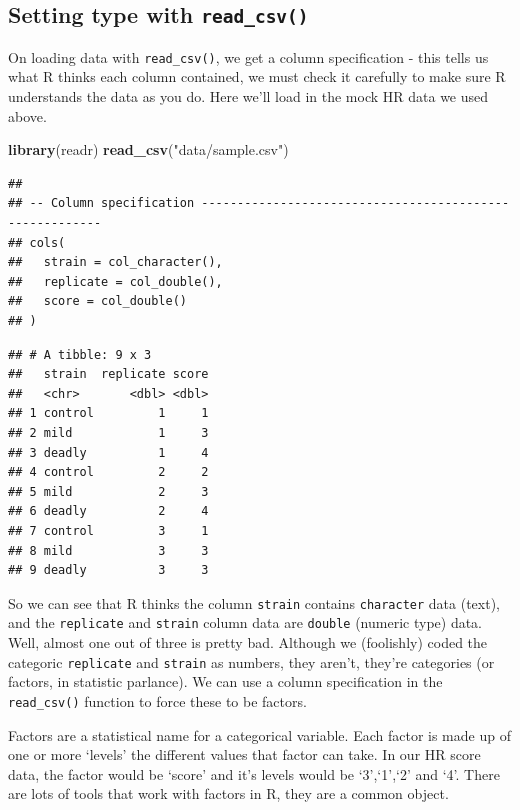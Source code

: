 \documentclass[
]{book}
\newenvironment{Shaded}{\begin{snugshade}}{\end{snugshade}}
\newcommand{\KeywordTok}[1]{\textcolor[rgb]{0.13,0.29,0.53}{\textbf{#1}}}
\newcommand{\NormalTok}[1]{#1}
\newcommand{\StringTok}[1]{\textcolor[rgb]{0.31,0.60,0.02}{#1}}
\newenvironment{sidenote}
{ \begin{tcolorbox}[colbacktitle=blue!50!white,
title=huh?,coltitle=white,
fonttitle=\bfseries] }
{  \end{tcolorbox} }
\begin{document}
\hypertarget{setting-type-with-read_csv}{%
\subsection{\texorpdfstring{Setting type with \texttt{read\_csv()}}{Setting type with read\_csv()}}\label{setting-type-with-read_csv}}

On loading data with \texttt{read\_csv()}, we get a column specification - this tells us what R thinks each column contained, we must check it carefully to make sure R understands the data as you do. Here we'll load in the mock HR data we used above.

\begin{Shaded}
\begin{Highlighting}[]
\KeywordTok{library}\NormalTok{(readr)}
\KeywordTok{read_csv}\NormalTok{(}\StringTok{"data/sample.csv"}\NormalTok{)}
\end{Highlighting}
\end{Shaded}

\begin{verbatim}
## 
## -- Column specification --------------------------------------------------------
## cols(
##   strain = col_character(),
##   replicate = col_double(),
##   score = col_double()
## )
\end{verbatim}

\begin{verbatim}
## # A tibble: 9 x 3
##   strain  replicate score
##   <chr>       <dbl> <dbl>
## 1 control         1     1
## 2 mild            1     3
## 3 deadly          1     4
## 4 control         2     2
## 5 mild            2     3
## 6 deadly          2     4
## 7 control         3     1
## 8 mild            3     3
## 9 deadly          3     3
\end{verbatim}

So we can see that R thinks the column \texttt{strain} contains \texttt{character} data (text), and the \texttt{replicate} and \texttt{strain} column data are \texttt{double} (numeric type) data. Well, almost one out of three is pretty bad. Although we (foolishly) coded the categoric \texttt{replicate} and \texttt{strain} as numbers, they aren't, they're categories (or factors, in statistic parlance). We can use a column specification in the \texttt{read\_csv()} function to force these to be factors.

\begin{sidenote}
Factors are a statistical name for a categorical variable. Each factor is made up of one or more `levels' the different values that factor can take. In our HR score data, the factor would be `score' and it's levels would be `3',`1',`2' and `4'. There are lots of tools that work with factors in R, they are a common object.
\end{sidenote}
\end{document}
